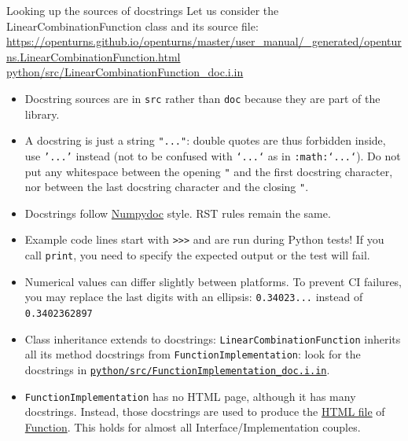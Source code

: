 \documentclass[8pt]{beamer}
\begin{document}
\begin{frame}{Looking up the sources of docstrings}
Let us consider the \alert{LinearCombinationFunction} class and its source file:
\url{https://openturns.github.io/openturns/master/user_manual/_generated/openturns.LinearCombinationFunction.html}
\href{https://github.com/openturns/openturns/blob/master/python/src/LinearCombinationFunction_doc.i.in}{python/\alert{src}/LinearCombinationFunction\_doc.i.in}

\begin{itemize}
    \item Docstring sources are in \texttt{src} rather than \texttt{doc} because they are \alert{part of the library}.
    \item A docstring is \alert{just a string} \texttt{"..."}: double quotes are thus forbidden inside, use \texttt{'...'} instead (not to be confused with \texttt{`...`} as in \texttt{:math:`...`}). Do not put any whitespace between the opening \texttt{"} and the first docstring character, nor between the last docstring character and the closing \texttt{"}.
    \item Docstrings follow \href{https://numpydoc.readthedocs.io/en/latest/index.html}{\alert{Numpydoc}} style. \alert{RST rules remain the same.}
    \item Example code lines start with \alert{\texttt{>{}>{}>}} and are run during Python tests! If you call \texttt{print}, you need to \alert{specify the expected output} or the test will fail.
    \item Numerical values can differ slightly between platforms.
    To prevent CI failures, you may replace the last digits with an \alert{ellipsis}: \texttt{0.34023...} instead of \texttt{0.3402362897}
    \item Class inheritance extends to docstrings: \texttt{LinearCombinationFunction} inherits all its method docstrings from \alert{\texttt{FunctionImplementation}}: look for the docstrings in \href{https://github.com/openturns/openturns/blob/master/python/src/FunctionImplementation_doc.i.in}{\texttt{python/src/FunctionImplementation\_doc.i.in}}.
    \item \texttt{FunctionImplementation} has no HTML page, although it has many docstrings.
    Instead, those docstrings are used to produce the \href{https://openturns.github.io/openturns/master/user_manual/_generated/openturns.Function.html}{\alert{HTML file}}
    of \href{https://github.com/openturns/openturns/blob/master/python/src/Function_doc.i.in}{\alert{Function}}.
    This holds for almost all Interface/Implementation couples.
\end{itemize}
    
\end{frame}
\end{document}

